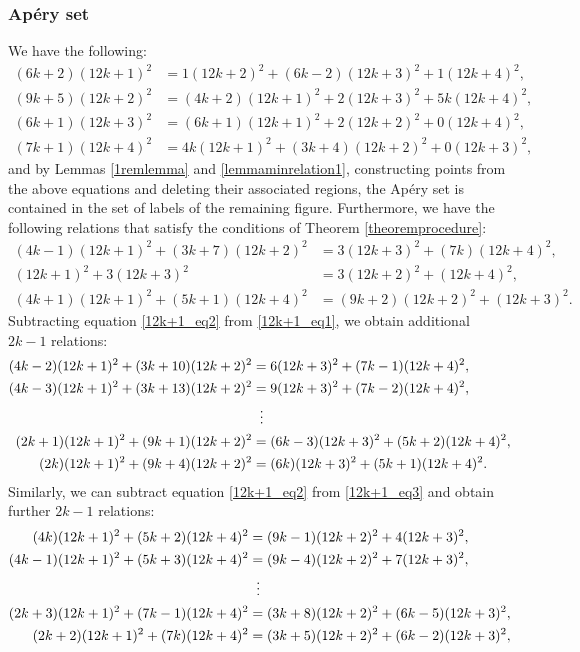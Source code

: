 \documentclass[12pt]{article}
\theoremstyle{remark}
\begin{document}
\subsubsection{Ap{\'e}ry set}
We have the following:
\begin{align}
    (6k+2)(12k+1)^2 &= 1(12k+2)^2 + (6k-2)(12k+3)^2 + 1(12k+4)^2, \label{12k+1minrelation0} \\
    (9k+5)(12k+2)^2 &= (4k+2)(12k+1)^2 + 2(12k+3)^2 + 5k(12k+4)^2, \label{12k+1minrelation1} \\
    (6k+1)(12k+3)^2 &= (6k+1)(12k+1)^2 + 2(12k+2)^2 + 0(12k+4)^2, \label{12k+1minrelation2}\\
    (7k+1)(12k+4)^2 &= 4k(12k+1)^2 + (3k+4)(12k+2)^2 + 0(12k+3)^2,  \label{12k+1minrelation3}
\end{align}
and by Lemmas \ref{1remlemma} and \ref{lemmaminrelation1}, constructing points from the above equations and deleting their associated regions, the Ap{\'e}ry set is contained in the set of labels of the remaining figure.
Furthermore, we have the following relations that satisfy the conditions of Theorem \ref{theoremprocedure}:
\begin{align}
  (4k-1)(12k+1)^2 + (3k+7)(12k+2)^2  &= 3(12k+3)^2 + (7k)(12k+4)^2, \label{12k+1_eq1} \\
    (12k+1)^2 + 3(12k+3)^2 &= 3(12k+2)^2 + (12k+4)^2, \label{12k+1_eq2} \\
    (4k+1)(12k+1)^2 + (5k+1)(12k+4)^2  &= (9k+2)(12k+2)^2 + (12k+3)^2. \label{12k+1_eq3}
\end{align}
Subtracting equation \eqref{12k+1_eq2} from \eqref{12k+1_eq1}, we obtain additional $2k-1$ relations:
\begin{equation}\label{12k+1_2k-1equations_1}
\begin{aligned}    
(4k-2)(12k+1)^2 + (3k+10)(12k+2)^2  &= 6(12k+3)^2 + (7k-1)(12k+4)^2,\\
(4k-3)(12k+1)^2 + (3k+13)(12k+2)^2  &= 9(12k+3)^2 + (7k-2)(12k+4)^2,\\
 & \hspace{5.6pt}  \vdots      \\
(2k+1)(12k+1)^2 + (9k+1)(12k+2)^2  &= (6k-3)(12k+3)^2 + (5k+2)(12k+4)^2,\\
(2k)(12k+1)^2 + (9k+4)(12k+2)^2  &= (6k)(12k+3)^2 + (5k+1)(12k+4)^2.
\end{aligned}
\end{equation}
Similarly, we can subtract equation \eqref{12k+1_eq2} from \eqref{12k+1_eq3} and obtain further $2k-1$ relations:
\begin{equation}\label{12k+1_2k-1equations_2}
\begin{aligned}    
 (4k)(12k+1)^2 + (5k+2)(12k+4)^2  &= (9k-1)(12k+2)^2 + 4(12k+3)^2,\\
(4k-1)(12k+1)^2 + (5k+3)(12k+4)^2  &= (9k-4)(12k+2)^2 + 7(12k+3)^2,\\
 & \hspace{5.6pt}  \vdots      \\
(2k+3)(12k+1)^2 + (7k-1)(12k+4)^2  &= (3k+8)(12k+2)^2 + (6k-5)(12k+3)^2,\\
(2k+2)(12k+1)^2 + (7k)(12k+4)^2  &= (3k+5)(12k+2)^2 + (6k-2)(12k+3)^2,
\end{aligned}
\end{equation}
\end{document}
